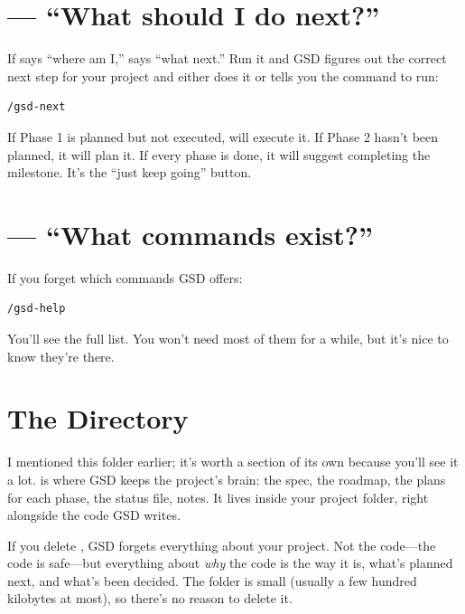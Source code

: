 \documentclass[11pt,letterpaper,openany]{book}
\begin{document}
\section{\texorpdfstring{}{/gsd-next} --- ``What should I do next?''}

If  says ``where am I,''  says ``what
next.'' Run it and GSD figures out the correct next step for your
project and either does it or tells you the command to run:

\begin{lstlisting}
/gsd-next
\end{lstlisting}

If Phase 1 is planned but not executed,  will execute it.
If Phase 2 hasn't been planned, it will plan it. If every phase is
done, it will suggest completing the milestone. It's the ``just keep
going'' button.

\section{\texorpdfstring{}{/gsd-help} --- ``What commands exist?''}

If you forget which commands GSD offers:

\begin{lstlisting}
/gsd-help
\end{lstlisting}

You'll see the full list. You won't need most of them for a while,
but it's nice to know they're there.

\section{The  Directory}

I mentioned this folder earlier; it's worth a section of its own
because you'll see it a lot.  is where GSD keeps
the project's brain: the spec, the roadmap, the plans for each phase,
the status file, notes. It lives inside your project folder, right
alongside the code GSD writes.

\begin{gsdimportant}
If you delete , GSD forgets everything about your
project. Not the code---the code is safe---but everything about
\emph{why} the code is the way it is, what's planned next, and what's
been decided. The folder is small (usually a few hundred kilobytes at
most), so there's no reason to delete it.
\end{gsdimportant}
\end{document}
